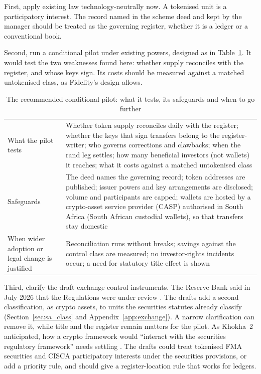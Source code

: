 \documentclass[12pt,a4paper]{article}
\begin{document}
First, apply existing law technology-neutrally now. A tokenised unit is a participatory interest. The record named in the scheme deed and kept by the manager should be treated as the governing register, whether it is a ledger or a conventional book.

Second, run a conditional pilot under existing powers, designed as in Table~\ref{tab:pilot}. It would test the two weaknesses found here: whether supply reconciles with the register, and whose keys sign. Its costs should be measured against a matched untokenised class, as Fidelity's design allows.

\begin{table}[htbp]
\centering
\small
\caption{The recommended conditional pilot: what it tests, its safeguards and when to go further}\label{tab:pilot}
\begin{tabular}{>{\raggedright\arraybackslash}p{2.6cm}>{\raggedright\arraybackslash}p{12.3cm}}
\hline
What the pilot tests & Whether token supply reconciles daily with the register; whether the keys that sign transfers belong to the register-writer; who governs corrections and clawbacks; when the rand leg settles; how many beneficial investors (not wallets) it reaches; what it costs against a matched untokenised class \\
\addlinespace
Safeguards & The deed names the governing record; token addresses are published; issuer powers and key arrangements are disclosed; volume and participants are capped; wallets are hosted by a crypto-asset service provider (CASP) authorised in South Africa (South African custodial wallets), so that transfers stay domestic \\
\addlinespace
When wider adoption or legal change is justified & Reconciliation runs without breaks; savings against the control class are measured; no investor-rights incidents occur; a need for statutory title effect is shown \\
\hline
\end{tabular}
\end{table}

Third, clarify the draft exchange-control instruments. The Reserve Bank said in July 2026 that the Regulations were under review \citep[p.~2]{SARB2026Circular19}. The drafts add a second classification, as crypto assets, to units the securities statutes already classify (Section~\ref{sec:sa_class} and Appendix~\ref{app:exchange}). A narrow clarification can remove it, while title and the register remain matters for the pilot. As Khokha~2 anticipated, how a crypto framework would ``interact with the securities regulatory framework'' needs settling \citep[p.~43]{SARB2022Khokha2}. The drafts could treat tokenised FMA securities and CISCA participatory interests under the securities provisions, or add a priority rule, and should give a register-location rule that works for ledgers.
\end{document}
